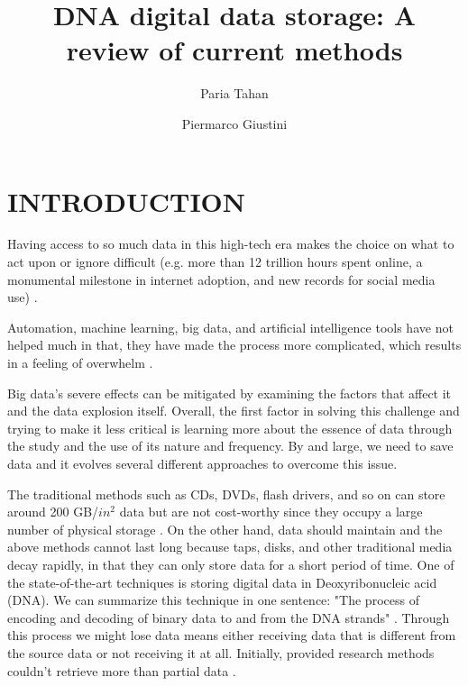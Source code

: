 \documentclass[10pt,twocolumn,twoside]{gsajnl}
\title{DNA digital data storage: A review of current methods}
\author[1]{Paria Tahan}
\author[2]{Piermarco Giustini}
\affil[1]{paria.tahan@studenti.unipd.it}
\affil[2]{piermarco.giustini@studenti.unipd.it}
\begin{document}
\maketitle

\thispagestyle{firststyle}
\vspace{-10pt}%


\section{INTRODUCTION}
Having access to so much data in this high-tech era makes the choice on what to act upon or ignore difficult (e.g. more than 12 trillion hours spent online, a monumental milestone in internet adoption, and new records for social media use) \cite{datareportal}.

Automation, machine learning, big data, and artificial intelligence tools have not helped much in that, they have made the process more complicated, which results in a feeling of overwhelm \cite{alliance2021preserving}.

Big data's severe effects can be mitigated by examining the factors that affect it and the data explosion itself. Overall, the first factor in solving this challenge and trying to make it less critical is learning more about the essence of data through the study and the use of its nature and frequency. By and large, we need to save data and it evolves several different approaches to overcome this issue. 

The traditional methods such as CDs, DVDs, flash drivers, and so on can store around 200 GB/$in^2$ data but are not cost-worthy since they occupy a large number of physical storage \cite{wang2019high}. On the other hand, data should maintain and the above methods cannot last long because taps, disks, and other traditional media decay rapidly, in that they can only store data for a short period of time. One of the state-of-the-art techniques is storing digital data in Deoxyribonucleic acid (DNA). We can summarize this technique in one sentence: "The process of encoding and decoding of binary data to and from the DNA strands" \cite{ceze2019molecular}. Through this process we might lose data means either receiving data that is different from the source data or not receiving it at all. Initially, provided research methods couldn't retrieve more than partial data \cite{church2012next}.
\end{document}
